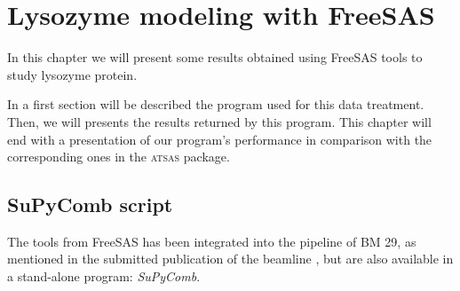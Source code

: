 \documentclass[a4paper, 11pt]{report}
\begin{document}
\chapter{Lysozyme modeling with FreeSAS}%

In this chapter we will present some results obtained using FreeSAS 
tools to study lysozyme protein.

In a first section will be described the program used for this data 
treatment. 
Then, we will presents the results returned by this program. 
This chapter will end with a presentation of our program's performance 
in comparison with the corresponding ones in the \textsc{atsas} 
package.

\section{SuPyComb script}

The tools from FreeSAS has been integrated into the pipeline of BM 29, 
as mentioned in the submitted publication of the beamline 
\cite{bm29news}, but are also available in a stand-alone program: 
\textit{SuPyComb}.\\
\end{document}

